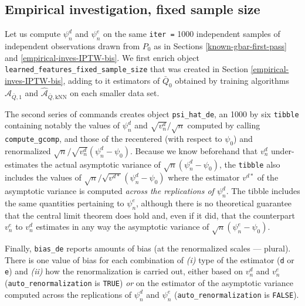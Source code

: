 \documentclass[
  11pt,
  openright,twoside]{book}
\newcommand{\Algo}{\widehat{\mathcal{A}}}
\newcommand{\Qbar}{\bar{Q}}
\theoremstyle{definition}
\theoremstyle{definition}
\theoremstyle{definition}
\theoremstyle{definition}
\theoremstyle{remark}
\begin{document}
\hypertarget{empirical-inves-Gcomp}{%
\subsection{Empirical investigation, fixed sample size}\label{empirical-inves-Gcomp}}

Let us compute \(\psi_{n}^{d}\) and \(\psi_{n}^{e}\) on the same \texttt{iter\ =}
1000 independent samples of independent observations drawn from \(P_{0}\) as in
Sections \ref{known-gbar-first-pass} and \ref{empirical-inves-IPTW-bis}. We
first enrich object \texttt{learned\_features\_fixed\_sample\_size} that was created in
Section \ref{empirical-inves-IPTW-bis}, adding to it estimators of
\(\Qbar_{0}\) obtained by training algorithms \(\Algo_{\Qbar,1}\) and
\(\Algo_{\Qbar,\text{kNN}}\) on each smaller data set.

The second series of commands creates object \texttt{psi\_hat\_de}, an 1000 by six
\texttt{tibble} containing notably the values of \(\psi_{n}^{d}\) and
\(\sqrt{v_{n}^{d}}/\sqrt{n}\) computed by calling \texttt{compute\_gcomp}, and those of
the recentered (with respect to \(\psi_{0}\)) and renormalized
\(\sqrt{n}/\sqrt{v_{n}^{d}} (\psi_{n}^{d} - \psi_{0})\). Because we know
beforehand that \(v_{n}^{d}\) under-estimates the actual asymptotic variance of
\(\sqrt{n} (\psi_{n}^{d} - \psi_{0})\), the \texttt{tibble} also includes the values of
\(\sqrt{n}/\sqrt{v^{d*}} (\psi_{n}^{d} - \psi_{0})\) where the estimator
\(v^{d*}\) of the asymptotic variance is computed \emph{across the replications of
\(\psi_{n}^{d}\)}. The tibble includes the same quantities pertaining to
\(\psi_{n}^{e}\), although there is no theoretical guarantee that the central
limit theorem does hold and, even if it did, that the counterpart \(v_{n}^{e}\)
to \(v_{n}^{d}\) estimates in any way the asymptotic variance of \(\sqrt{n} (\psi_{n}^{e} - \psi_{0})\).

Finally, \texttt{bias\_de} reports amounts of bias (at the renormalized scales ---
plural). There is one value of bias for each combination of \emph{(i)} type of the
estimator (\texttt{d} or \texttt{e}) and \emph{(ii)} how the renormalization is carried out,
either based on \(v_{n}^{d}\) and \(v_{n}^{e}\) (\texttt{auto\_renormalization} is \texttt{TRUE})
\emph{or} on the estimator of the asymptotic variance computed across the
replications of \(\psi_{n}^{d}\) and \(\psi_{n}^{e}\) (\texttt{auto\_renormalization} is
\texttt{FALSE}).
\end{document}
